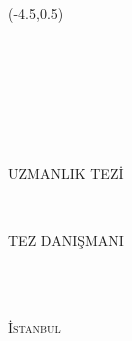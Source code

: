 
\begin{titlepage}
\begin{center}


\begin{textblock}{20}(-4.5,0.5)
\centering
\Large{\textbf\univname}\\[1.5cm]

\begin{minipage}{0.4\textwidth}
	\begin{center} \large
	 \MakeUppercase{\klinikname}\\[1cm]
	\end{center}
\end{minipage}
\end{textblock}



\vspace{7cm}

\HRule \\[1cm] %
{\large  \bfseries \ttitle}\\[0.4cm] %
\HRule \\[1cm] %


\begin{minipage}{0.7\textwidth}
\begin{center} \large
\authornames \\
UZMANLIK TEZİ
 \smallskip
\end{center}
\end{minipage}\\[1cm]

\begin{minipage}{0.7\textwidth}
	\begin{center} \large
		{TEZ DANIŞMANI} \\
		\supname\\
	\end{center}
\end{minipage}\\[3cm]


\bigskip



\vfill
\textsc {İstanbul}\\
\mytoday
\end{center}
\end{titlepage}